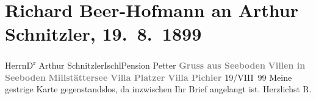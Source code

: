 

         \renewcommand{\erwaehnteOrte}{Orte: Bad Ischl, Hotel und Pension Rudolfshöhe (Leopold Petter), Millstätter See, Seeboden, Villa Pichler, Villa Platzer}
         \renewcommand{\erwaehnteWerke}{}
               \section[Richard Beer-Hofmann an Arthur Schnitzler, 19. 8. 1899]{ Richard Beer-Hofmann an Arthur Schnitzler, 19. 8. 1899}\nopagebreak{}\rehead{ }\begin{ledgroupsized}[t]{13cm}\normalsize\beginnumbering \toendnotes[C]{\smallbreak\pagebreak[2]} 
\pstart{}{\pb}Herrn\pend{}\pstart{}D\textsuperscript{r} Arthur Schnitzler\pend{}\pstart{}Ischl\pend{}\pstart{}Pension Petter\pend{}{\bigskip}\pstart
           \noindent{}\centering{}{\pb}\textcolor{gray}{\textbf{Gruss aus Seeboden}}\pend
           \pstart
           \noindent{}\centering{}\textcolor{gray}{\textbf{Villen in Seeboden}}\pend
           \pstart
           \noindent{}\centering{}\textcolor{gray}{\textbf{Millstättersee}}\pend
           \pstart
           \noindent{}\centering{}\textcolor{gray}{\textbf{Villa Platzer}}\pend
           \pstart
           \noindent{}\centering{}\textcolor{gray}{\textbf{Villa Pichler}}\pend
           \pstart
           \raggedleft{}19/VIII 99\pend
           \pstart
           Meine gestrige Karte gegenstandslos, da inzwischen Ihr Brief angelangt ist.\pend
           \pstart Herzlichst \spacefill\mbox{R.}\pend{}
         
         \endnumbering{}\end{ledgroupsized}  \newcommand{\dateiname}{L00961}\newcommand{\titel}{Richard Beer-Hofmann an Arthur Schnitzler, 19. 8. 1899}\newcommand{\editorInnen}{Martin Anton Müller und Gerd-Hermann Susen}
      
